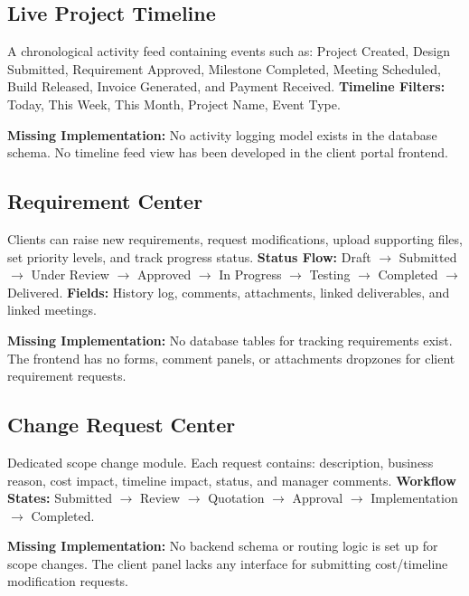 \documentclass[11pt,a4paper]{article}
\begin{document}
\subsection{Live Project Timeline}
A chronological activity feed containing events such as: Project Created, Design Submitted, Requirement Approved, Milestone Completed, Meeting Scheduled, Build Released, Invoice Generated, and Payment Received.
\newline
\textbf{Timeline Filters:} Today, This Week, This Month, Project Name, Event Type.
\begin{missingstatus}
  \textbf{Missing Implementation:} No activity logging model exists in the database schema. No timeline feed view has been developed in the client portal frontend.
\end{missingstatus}

\subsection{Requirement Center}
Clients can raise new requirements, request modifications, upload supporting files, set priority levels, and track progress status.
\newline
\textbf{Status Flow:} Draft $\rightarrow$ Submitted $\rightarrow$ Under Review $\rightarrow$ Approved $\rightarrow$ In Progress $\rightarrow$ Testing $\rightarrow$ Completed $\rightarrow$ Delivered.
\newline
\textbf{Fields:} History log, comments, attachments, linked deliverables, and linked meetings.
\begin{missingstatus}
  \textbf{Missing Implementation:} No database tables for tracking requirements exist. The frontend has no forms, comment panels, or attachments dropzones for client requirement requests.
\end{missingstatus}

\subsection{Change Request Center}
Dedicated scope change module. Each request contains: description, business reason, cost impact, timeline impact, status, and manager comments.
\newline
\textbf{Workflow States:} Submitted $\rightarrow$ Review $\rightarrow$ Quotation $\rightarrow$ Approval $\rightarrow$ Implementation $\rightarrow$ Completed.
\begin{missingstatus}
  \textbf{Missing Implementation:} No backend schema or routing logic is set up for scope changes. The client panel lacks any interface for submitting cost/timeline modification requests.
\end{missingstatus}
\end{document}

